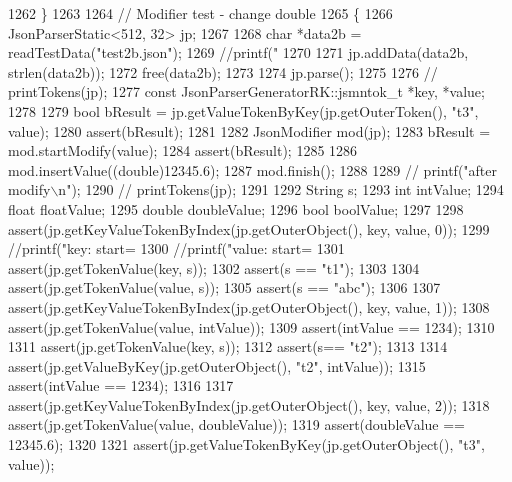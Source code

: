 \begin{DoxyCode}
{{{{{{{{{{{{{{{{{{1262     \}
1263 
1264     \textcolor{comment}{// Modifier test - change double}
1265     \{
1266         JsonParserStatic<512, 32> jp;
1267 
1268         \textcolor{keywordtype}{char} *data2b = readTestData(\textcolor{stringliteral}{"test2b.json"});
1269         \textcolor{comment}{//printf("%
1270 
1271         jp.addData(data2b, strlen(data2b));
1272         free(data2b);
1273 
1274         jp.parse();
1275 
1276         \textcolor{comment}{// printTokens(jp);}
1277         \textcolor{keyword}{const} JsonParserGeneratorRK::jsmntok_t *key, *value;
1278 
1279         \textcolor{keywordtype}{bool} bResult = jp.getValueTokenByKey(jp.getOuterToken(), \textcolor{stringliteral}{"t3"}, value);
1280         assert(bResult);
1281 
1282         JsonModifier mod(jp);
1283         bResult = mod.startModify(value);
1284         assert(bResult);
1285 
1286         mod.insertValue((\textcolor{keywordtype}{double})12345.6);
1287         mod.finish();
1288 
1289         \textcolor{comment}{// printf("after modify\(\backslash\)n");}
1290         \textcolor{comment}{// printTokens(jp);}
1291 
1292         String s;
1293         \textcolor{keywordtype}{int} intValue;
1294         \textcolor{keywordtype}{float} floatValue;
1295         \textcolor{keywordtype}{double} doubleValue;
1296         \textcolor{keywordtype}{bool} boolValue;
1297 
1298         assert(jp.getKeyValueTokenByIndex(jp.getOuterObject(), key, value, 0));
1299         \textcolor{comment}{//printf("key: start=%
1300         \textcolor{comment}{//printf("value: start=%
1301         assert(jp.getTokenValue(key, s));
1302         assert(s == \textcolor{stringliteral}{"t1"});
1303 
1304         assert(jp.getTokenValue(value, s));
1305         assert(s == \textcolor{stringliteral}{"abc"});
1306 
1307         assert(jp.getKeyValueTokenByIndex(jp.getOuterObject(), key, value, 1));
1308         assert(jp.getTokenValue(value, intValue));
1309         assert(intValue == 1234);
1310 
1311         assert(jp.getTokenValue(key, s));
1312         assert(s== \textcolor{stringliteral}{"t2"});
1313 
1314         assert(jp.getValueByKey(jp.getOuterObject(), \textcolor{stringliteral}{"t2"}, intValue));
1315         assert(intValue == 1234);
1316 
1317         assert(jp.getKeyValueTokenByIndex(jp.getOuterObject(), key, value, 2));
1318         assert(jp.getTokenValue(value, doubleValue));
1319         assert(doubleValue == 12345.6);
1320 
1321         assert(jp.getValueTokenByKey(jp.getOuterObject(), \textcolor{stringliteral}{"t3"}, value));
}}}}}}}}}}}}}}}}}}}}}
\end{DoxyCode}
